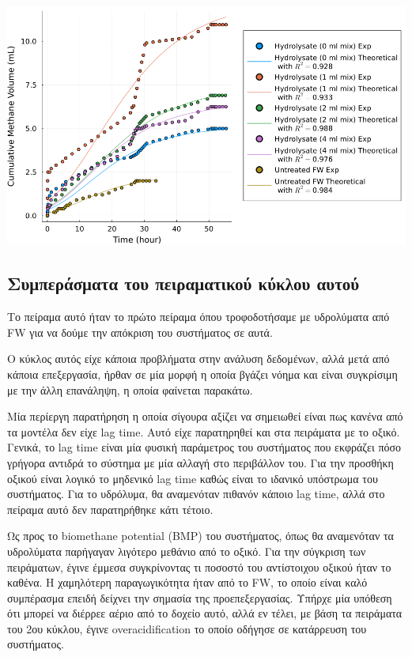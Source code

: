\documentclass[11pt]{article}
\begin{document}
\begin{center}
\includegraphics[width=.9\linewidth]{../plots/BMPs/methane_s1_r1_comp.png}
\end{center}

\subsection{Συμπεράσματα του πειραματικού κύκλου αυτού}
\label{sec:org60f6f61}
Το πείραμα αυτό ήταν το πρώτο πείραμα όπου τροφοδοτήσαμε με υδρολύματα από FW για να δούμε την απόκριση του συστήματος σε αυτά.

Ο κύκλος αυτός είχε κάποια προβλήματα στην ανάλυση δεδομένων, αλλά μετά από κάποια επεξεργασία, ήρθαν σε μία μορφή η οποία βγάζει νόημα και είναι συγκρίσιμη με την άλλη επανάληψη, η οποία φαίνεται παρακάτω.

Μία περίεργη παρατήρηση η οποία σίγουρα αξίζει να σημειωθεί είναι πως κανένα από τα μοντέλα δεν είχε lag time. Αυτό είχε παρατηρηθεί και στα πειράματα με το οξικό. Γενικά, το lag time είναι μία φυσική παράμετρος του συστήματος που εκφράζει πόσο γρήγορα αντιδρά το σύστημα με μία αλλαγή στο περιβάλλον του. Για την προσθήκη οξικού είναι λογικό το μηδενικό lag time καθώς είναι το ιδανικό υπόστρωμα του συστήματος. Για το υδρόλυμα, θα αναμενόταν πιθανόν κάποιο lag time, αλλά στο πείραμα αυτό δεν παρατηρήθηκε κάτι τέτοιο.

Ως προς το biomethane potential (BMP) του συστήματος, όπως θα αναμενόταν τα υδρολύματα παρήγαγαν λιγότερο μεθάνιο από το οξικό. Για την σύγκριση των πειράματων, έγινε έμμεσα συγκρίνοντας τι ποσοστό του αντίστοιχου οξικού ήταν το καθένα. Η χαμηλότερη παραγωγικότητα ήταν από το FW, το οποίο είναι καλό συμπέρασμα επειδή δείχνει την σημασία της προεπεξεργασίας. Υπήρχε μία υπόθεση ότι μπορεί να διέρρεε αέριο από το δοχείο αυτό, αλλά εν τέλει, με βάση τα πειράματα του 2ου κύκλου, έγινε overacidification το οποίο οδήγησε σε κατάρρευση του συστήματος.
\end{document}
